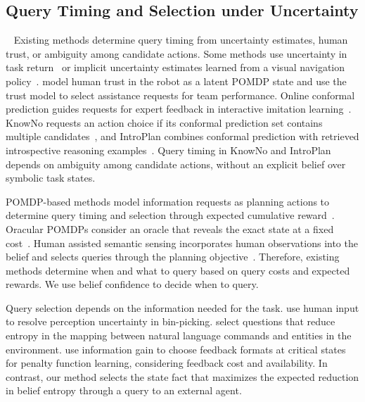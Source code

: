 \subsection{Query Timing and Selection under Uncertainty}~\label{rel:selective_querying}
Existing methods determine query timing from uncertainty estimates, human trust, or ambiguity among candidate actions. Some methods use uncertainty in task return~\citep{singi2023hula} or implicit uncertainty estimates learned from a visual navigation policy~\citep{igbinedion2024learning}. \citet{mangalindan2025seek} model human trust in the robot as a latent POMDP state and use the trust model to select assistance requests for team performance. Online conformal prediction guides requests for expert feedback in interactive imitation learning~\citep{zhao2025conformalized}. KnowNo requests an action choice if its conformal prediction set contains multiple candidates~\citep{ren2023robots}, and IntroPlan combines conformal prediction with retrieved introspective reasoning examples~\citep{liang2024introspective}. Query timing in KnowNo and IntroPlan depends on ambiguity among candidate actions, without an explicit belief over symbolic task states.


POMDP-based methods model information requests as planning actions to determine query timing and selection through expected cumulative reward~\citep{armstrongcrews2007oracular,burks2021collaborative,burks2023harps}. Oracular POMDPs consider an oracle that reveals the exact state at a fixed cost~\citep{armstrongcrews2007oracular}. Human assisted semantic sensing incorporates human observations into the belief and selects queries through the planning objective~\citep{burks2021collaborative,burks2023harps}. Therefore, existing methods determine when and what to query based on query costs and expected rewards. We use belief confidence to decide when to query.



Query selection depends on the information needed for the task. \citet{kaipa2016addressing} use human input to resolve perception uncertainty in bin-picking. \citet{deits2013clarifying} select questions that reduce entropy in the mapping between natural language commands and entities in the environment. \citet{anand2025adaptive} use information gain to choose feedback formats at critical states for penalty function learning, considering feedback cost and availability. In contrast, our method selects the state fact that maximizes the expected reduction in belief entropy through a query to an external agent.


